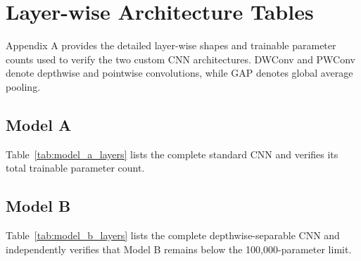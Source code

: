 \appendix
\section{Layer-wise Architecture Tables}
\label{app:architectures}
Appendix A provides the detailed layer-wise shapes and trainable parameter
counts used to verify the two custom CNN architectures. DWConv and PWConv
denote depthwise and pointwise convolutions, while GAP denotes global average
pooling.
\subsection{Model A}
Table~\ref{tab:model_a_layers} lists the complete standard CNN and verifies its
total trainable parameter count.

\clearpage
\subsection{Model B}
Table~\ref{tab:model_b_layers} lists the complete depthwise-separable CNN and
independently verifies that Model B remains below the 100,000-parameter limit.

